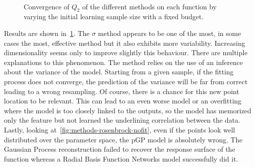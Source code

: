 \begin{figure}[!ht]
~
\caption{Convergence of $Q_2$ of the different methods on each function by varying the initial learning sample size with a fixed budget.}
\label{fig:methods-cv}
\end{figure}

Results are shown in~\cref{fig:methods-cv}. The $\sigma$ method appears to be one of the most, in some cases the most, effective method but it also exhibits more variability. Increasing dimensionality seems only to improve slightly this behaviour. There are multiple explanations to this phenomenon. The method relies on the use of an inference about the variance of the model. Starting from a given sample, if the fitting process does not converge, the prediction of the variance will be far from correct leading to a wrong resampling. Of course, there is a chance for this new point location to be relevant. This can lead to an even worse model or an overfitting where the model is too closely linked to the outputs, so the model has memorized only the feature but not learned the underlining correlation between the data. Lastly, looking at~\cref{fig:methods-rosenbrock-nofit}, even if the points look well distributed over the parameter space, the pGP model is absolutely wrong. The Gaussian Process reconstruction failed to recover the response surface of the function whereas a Radial Basis Function Networks model successfully did it.

